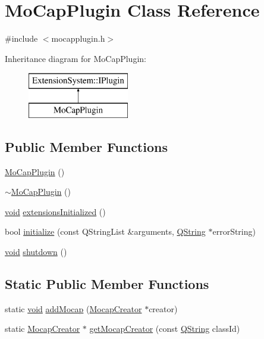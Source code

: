 \hypertarget{class_mo_cap_plugin}{\section{\-Mo\-Cap\-Plugin \-Class \-Reference}
\label{class_mo_cap_plugin}
}


{\ttfamily \#include $<$mocapplugin.\-h$>$}

\-Inheritance diagram for \-Mo\-Cap\-Plugin\-:\begin{figure}[H]
\begin{center}
\leavevmode
\includegraphics[height=2.000000cm]{class_mo_cap_plugin}
\end{center}
\end{figure}
\subsection*{\-Public \-Member \-Functions}
\begin{DoxyCompactItemize}
\item 
\hyperlink{group___mo_cap_plugin_gae4dfd9a9bb3746b1311deb0968382442}{\-Mo\-Cap\-Plugin} ()
\item 
\hyperlink{group___mo_cap_plugin_gae35a57590fd1156a31b514641702fb0e}{$\sim$\-Mo\-Cap\-Plugin} ()
\item 
\hyperlink{group___u_a_v_objects_plugin_ga444cf2ff3f0ecbe028adce838d373f5c}{void} \hyperlink{group___mo_cap_plugin_ga44d4c75032b9cb5698f876ff3cee5e09}{extensions\-Initialized} ()
\item 
bool \hyperlink{group___mo_cap_plugin_ga91a5975a6eb4f0771b265669e68b9732}{initialize} (const \-Q\-String\-List \&arguments, \hyperlink{group___u_a_v_objects_plugin_gab9d252f49c333c94a72f97ce3105a32d}{\-Q\-String} $\ast$error\-String)
\item 
\hyperlink{group___u_a_v_objects_plugin_ga444cf2ff3f0ecbe028adce838d373f5c}{void} \hyperlink{group___mo_cap_plugin_ga6ceccf865e672ec6799046772bb33346}{shutdown} ()
\end{DoxyCompactItemize}
\subsection*{\-Static \-Public \-Member \-Functions}
\begin{DoxyCompactItemize}
\item 
static \hyperlink{group___u_a_v_objects_plugin_ga444cf2ff3f0ecbe028adce838d373f5c}{void} \hyperlink{group___mo_cap_plugin_ga6af38b170105a0cbf49fcd99f3765f76}{add\-Mocap} (\hyperlink{class_mocap_creator}{\-Mocap\-Creator} $\ast$creator)
\item 
static \hyperlink{class_mocap_creator}{\-Mocap\-Creator} $\ast$ \hyperlink{group___mo_cap_plugin_ga1d86e516f13c5ef45cf76400e74fe8e5}{get\-Mocap\-Creator} (const \hyperlink{group___u_a_v_objects_plugin_gab9d252f49c333c94a72f97ce3105a32d}{\-Q\-String} class\-Id)
\end{DoxyCompactItemize}
